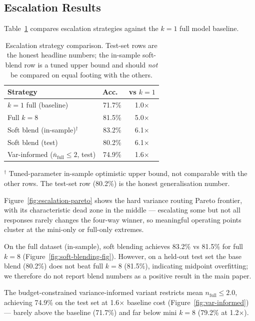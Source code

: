 \documentclass{article}
\begin{document}
\subsection{Escalation Results}
\label{sec:escalation-results}

Table~\ref{tab:escalation-summary} compares escalation strategies against the $k{=}1$ full model baseline.

\begin{table}[ht]
\centering
\caption{Escalation strategy comparison. Test-set rows are the honest headline numbers; the in-sample soft-blend row is a tuned upper bound and should \emph{not} be compared on equal footing with the others.}
\label{tab:escalation-summary}
\small
\setlength{\tabcolsep}{4pt}
\begin{tabular}{lcc}
\toprule
Strategy & Acc.\ & vs $k{=}1$ \\
\midrule
$k{=}1$ full (baseline)        & 71.7\% & 1.0$\times$ \\
Full $k{=}8$                   & 81.5\% & 5.0$\times$ \\
Soft blend (in-sample)$^\dagger$ & 83.2\% & 6.1$\times$ \\
Soft blend (test)              & 80.2\% & 6.1$\times$ \\
Var-informed ($\bar{n}_{\text{full}}{\leq}2$, test) & 74.9\% & 1.6$\times$ \\
\bottomrule
\end{tabular}

\vspace{2pt}
{\footnotesize $^\dagger$ Tuned-parameter in-sample optimistic upper bound, not comparable with the other rows. The test-set row (80.2\%) is the honest generalisation number.}
\end{table}

Figure~\ref{fig:escalation-pareto} shows the hard variance routing Pareto frontier, with its characteristic dead zone in the middle --- escalating some but not all responses rarely changes the four-way winner, so meaningful operating points cluster at the mini-only or full-only extremes.

On the full dataset (in-sample), soft blending achieves 83.2\% vs 81.5\% for full $k{=}8$ (Figure~\ref{fig:soft-blending-fig}). However, on a held-out test set the base blend (80.2\%) does not beat full $k{=}8$ (81.5\%), indicating midpoint overfitting; we therefore do not report blend numbers as a positive result in the main paper.

The budget-constrained variance-informed variant restricts mean $n_{\text{full}} \leq 2.0$, achieving 74.9\% on the test set at 1.6$\times$ baseline cost (Figure~\ref{fig:var-informed}) --- barely above the baseline (71.7\%) and far below mini $k{=}8$ (79.2\% at 1.2$\times$).
\end{document}
